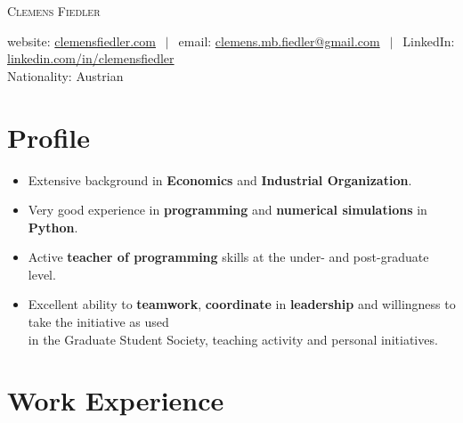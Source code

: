 \documentclass[a4paper,8pt]{article}
\begin{document}
\thispagestyle{empty}




\textsc{\Huge Clemens Fiedler}

website: \href{https://clemensfiedler.com/}{clemensfiedler.com} $~~\vert~~$ 
email: \href{mailto:clemens.mb.fiedler@gmail.com}{clemens.mb.fiedler@gmail.com} $~~\vert~~$ 
LinkedIn: \href{https://www.linkedin.com/in/clemensfiedler/}{linkedin.com/in/clemensfiedler}\\
Nationality: Austrian

\section{Profile}

\begin{itemize}[noitemsep]
	\item Extensive background in \textbf{Economics} and \textbf{Industrial Organization}.
	\item Very good experience in \textbf{programming} and \textbf{numerical simulations} in \textbf{Python}.
	\item Active \textbf{teacher of programming} skills at the under- and post-graduate level.
	\item Excellent ability to \textbf{teamwork}, \textbf{coordinate} in \textbf{leadership} and willingness to take the initiative as used\\ in the Graduate Student Society, teaching activity and personal initiatives.
\end{itemize}

\section{Work Experience}
\end{document}
